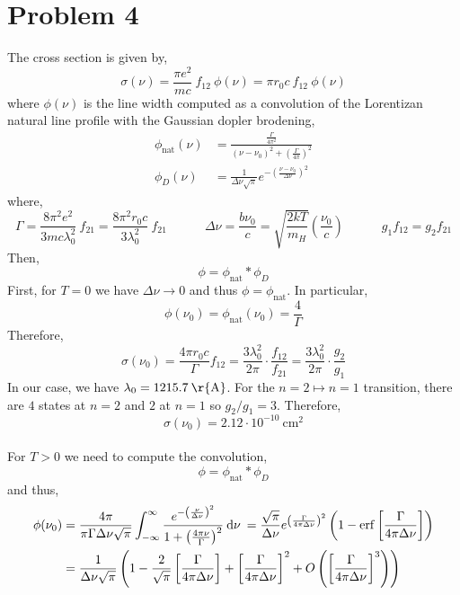 \documentclass[12pt]{article}
\begin{document}
\section{Problem 4}

The cross section is given by,
\[ \sigma(\nu) = \frac{\pi e^2}{mc} \: f_{12} \: \phi(\nu) = \pi r_0 c \: f_{12} \: \phi(\nu)  \]
where $\phi(\nu)$ is the line width computed as a convolution of the Lorentizan natural line profile with the Gaussian dopler brodening,
\begin{align*}
\phi_{\text{nat}}(\nu) & = \frac{ \frac{\Gamma}{4 \pi^2}}{(\nu - \nu_0)^2 + \left( \frac{\Gamma}{4 \pi} \right)^2}
\\
\phi_D(\nu) & = \frac{1}{\Delta \nu \sqrt{\pi}} e^{- \left( \frac{\nu - \nu_0}{\Delta \nu} \right)^2}
\end{align*}
where,
\[ \Gamma = \frac{8 \pi^2 e^2}{3 m c \lambda_0^2} \: f_{21} =  \frac{8 \pi^2 r_0 c}{3 \lambda_0^2} \: f_{21} \quad \quad \quad \Delta \nu = \frac{b \nu_0}{c} = \sqrt{\frac{2 k T}{m_H}} \left( \frac{\nu_0}{c} \right) \quad \quad \quad g_1 f_{12} = g_2 f_{21} \]
Then,
\[ \phi = \phi_{\text{nat}} * \phi_D \]
First, for $T = 0$ we have $\Delta \nu \to 0$ and thus $\phi = \phi_{\text{nat}}$. In particular,
\[ \phi(\nu_0) = \phi_{\text{nat}}(\nu_0) = \frac{4}{\Gamma} \]
Therefore,
\[ \sigma(\nu_0) = \frac{4 \pi r_0 c}{\Gamma} f_{12} = \frac{3 \lambda_0^2}{2 \pi}  \cdot \frac{f_{12}}{f_{21}} = \frac{3 \lambda_0^2}{2 \pi} \cdot \frac{g_2}{g_1} \]
In our case, we have $\lambda_0 = 1215.7 \: \mathrm{\r{A}}$. For the $n = 2 \mapsto n = 1$ transition, there are $4$ states at $n = 2$ and $2$ at $n = 1$ so $g_2 / g_1 = 3$. Therefore,
\[ \sigma(\nu_0) = 2.12 \cdot 10^{-10} \: \mathrm{cm}^2 \]
\bigskip\\
For $T > 0$ we need to compute the convolution, 
\[ \phi = \phi_{\text{nat}} * \phi_D \]
and thus,
\begin{align*}
\phi(\nu_0) & = \frac{4 \pi}{\pi \Gamma \Delta \nu \sqrt{\pi}} \int_{-\infty}^{\infty} \frac{e^{- \left( \frac{\nu}{\Delta \nu} \right)^2}}{1 + \left( \frac{4 \pi \nu}{\Gamma} \right)^2} \: \mathrm{d}\nu \: = \frac{\sqrt{\pi}}{\Delta \nu} e^{\left( \frac{\Gamma}{4 \pi \Delta \nu} \right)^2} \left( 1 - \mathrm{erf}\left[ \frac{\Gamma}{4 \pi \Delta \nu}\right] \right)
\\
& = \frac{1}{\Delta \nu \sqrt{\pi}} \left( 1 - \frac{2}{\sqrt{\pi}}  \left[  \frac{\Gamma}{4 \pi \Delta \nu}\right] +  \left[  \frac{\Gamma}{4 \pi \Delta \nu}\right]^2 + O \left( \left[  \frac{\Gamma}{4 \pi \Delta \nu}\right]^3 \right) \right)
\end{align*}
\end{document}
